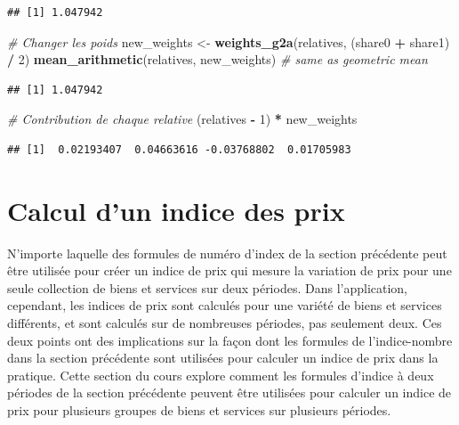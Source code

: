 \documentclass[]{article}
\newenvironment{Shaded}{\begin{snugshade}}{\end{snugshade}}
\newcommand{\CommentTok}[1]{\textcolor[rgb]{0.56,0.35,0.01}{\textit{#1}}}
\newcommand{\DecValTok}[1]{\textcolor[rgb]{0.00,0.00,0.81}{#1}}
\newcommand{\KeywordTok}[1]{\textcolor[rgb]{0.13,0.29,0.53}{\textbf{#1}}}
\newcommand{\NormalTok}[1]{#1}
\newcommand{\OperatorTok}[1]{\textcolor[rgb]{0.81,0.36,0.00}{\textbf{#1}}}
\newcommand{\StringTok}[1]{\textcolor[rgb]{0.31,0.60,0.02}{#1}}
\begin{document}
\begin{verbatim}
## [1] 1.047942
\end{verbatim}

\begin{Shaded}
\begin{Highlighting}[]
\CommentTok{# Changer les poids}
\NormalTok{new_weights <-}\StringTok{ }\KeywordTok{weights_g2a}\NormalTok{(relatives, (share0 }\OperatorTok{+}\StringTok{ }\NormalTok{share1) }\OperatorTok{/}\StringTok{ }\DecValTok{2}\NormalTok{)}
\KeywordTok{mean_arithmetic}\NormalTok{(relatives, new_weights) }\CommentTok{# same as geometric mean}
\end{Highlighting}
\end{Shaded}

\begin{verbatim}
## [1] 1.047942
\end{verbatim}

\begin{Shaded}
\begin{Highlighting}[]
\CommentTok{# Contribution de chaque relative}
\NormalTok{(relatives }\OperatorTok{-}\StringTok{ }\DecValTok{1}\NormalTok{) }\OperatorTok{*}\StringTok{ }\NormalTok{new_weights}
\end{Highlighting}
\end{Shaded}

\begin{verbatim}
## [1]  0.02193407  0.04663616 -0.03768802  0.01705983
\end{verbatim}

\hypertarget{calcul-dun-indice-des-prix}{%
\section{Calcul d'un indice des prix}\label{calcul-dun-indice-des-prix}}

N'importe laquelle des formules de numéro d'index de la section précédente peut être utilisée pour créer un indice de prix qui mesure la variation de prix pour une seule collection de biens et services sur deux périodes. Dans l'application, cependant, les indices de prix sont calculés pour une variété de biens et services différents, et sont calculés sur de nombreuses périodes, pas seulement deux. Ces deux points ont des implications sur la façon dont les formules de l'indice-nombre dans la section précédente sont utilisées pour calculer un indice de prix dans la pratique. Cette section du cours explore comment les formules d'indice à deux périodes de la section précédente peuvent être utilisées pour calculer un indice de prix pour plusieurs groupes de biens et services sur plusieurs périodes.
\end{document}

